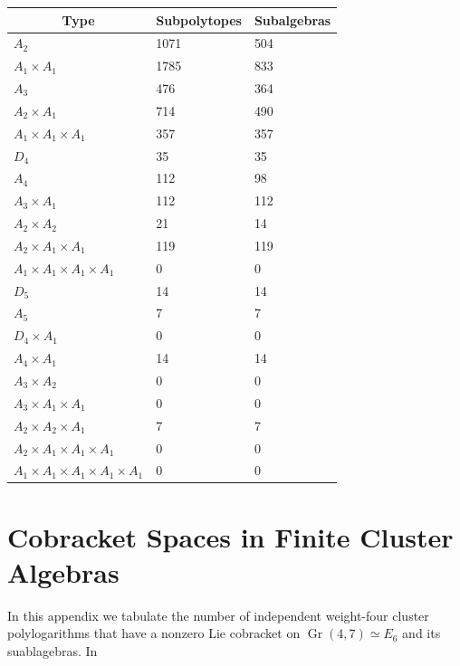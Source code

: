 \documentclass[12pt]{article}
\DeclareMathOperator{\Gr}{Gr}
\begin{document}
\begin{center}
\begin{tabular}{ | l | l | l |}
\multicolumn{1}{c}{Type} &  \multicolumn{1}{c}{Subpolytopes}  &  \multicolumn{1}{c}{Subalgebras} \\
\hline \(A_2\) & 1071 & 504 \\ 
\hline \(A_1 \times A_1\) & 1785 & 833 \\ \hline 
\hline \(A_3\) & 476 & 364 \\ 
\hline \(A_2 \times A_1\) & 714 & 490 \\ 
\hline \(A_1 \times A_1 \times A_1\) & 357 & 357 \\ \hline 
\hline \(D_4\) & 35 & 35 \\ 
\hline \(A_4\) & 112 & 98 \\ 
\hline \(A_3 \times A_1\) & 112 & 112 \\ 
\hline \(A_2 \times A_2\) & 21 & 14 \\ 
\hline \(A_2 \times A_1 \times A_1\) & 119 & 119 \\ 
\hline \(A_1 \times A_1 \times A_1 \times A_1\) & 0 & 0 \\ \hline 
\hline \(D_5\) & 14 & 14 \\ 
\hline \(A_5\) & 7 & 7 \\ 
\hline \(D_4 \times A_1\) & 0 & 0 \\ 
\hline \(A_4 \times A_1\) & 14 & 14 \\ 
\hline \(A_3 \times A_2\) & 0 & 0 \\ 
\hline \(A_3 \times A_1 \times A_1\) & 0 & 0 \\ 
\hline \(A_2 \times A_2 \times A_1\) & 7 & 7 \\ 
\hline \(A_2 \times A_1 \times A_1 \times A_1\) & 0 & 0 \\ 
\hline \(A_1 \times A_1 \times A_1 \times A_1 \times A_1\) & 0 & 0 \\ 
\hline
\end{tabular}
\end{center}

\newpage

\section{Cobracket Spaces in Finite Cluster Algebras}\label{appendix:cobrackets}


\parbox{\textwidth}{In this appendix we tabulate the number of independent weight-four cluster polylogarithms that have a nonzero Lie cobracket on $\Gr(4,7) \simeq E_6$ and its suablagebras. In  \parfillskip=0pt}
\end{document}
